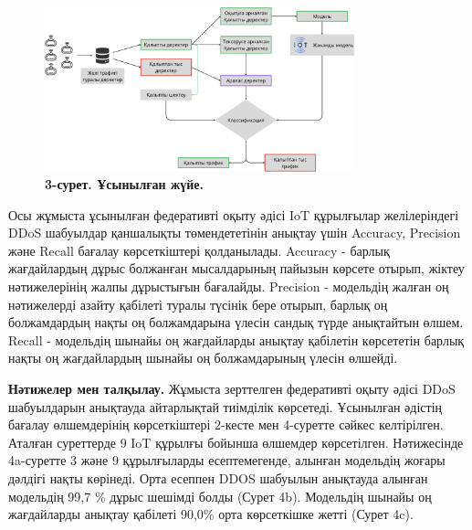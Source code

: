 \begin{figure}[H]
	\centering
	\includegraphics[width=0.8\textwidth]{assets/201}
	\caption*{\bfseries 3-сурет. Ұсынылған жүйе.}
\end{figure}



Осы жұмыста ұсынылған федеративті оқыту әдісі IoT құрылғылар
желілеріндегі DDoS шабуылдар қаншалықты төмендететінін анықтау үшін
Accuracy, Precision және Recall бағалау көрсеткіштері қолданылады.
Accuracy - барлық жағдайлардың дұрыс болжанған мысалдарының пайызын
көрсете отырып, жіктеу нәтижелерінің жалпы дұрыстығын бағалайды.
Precision - модельдің жалған оң нәтижелерді азайту қабілеті туралы
түсінік бере отырып, барлық оң болжамдардың нақты оң болжамдарына үлесін
сандық түрде анықтайтын өлшем. Recall - модельдің шынайы оң жағдайларды
анықтау қабілетін көрсететін барлық нақты оң жағдайлардың шынайы оң
болжамдарының үлесін өлшейді.

{\bfseries Нәтижелер мен талқылау.} Жұмыста зерттелген федеративті оқыту
әдісі DDoS шабуылдарын анықтауда айтарлықтай тиімділік көрсетеді.
Ұсынылған әдістің бағалау өлшемдерінің көрсеткіштері 2-кесте мен
4-суретте сәйкес келтірілген. Аталған суреттерде 9 IoT құрылғы бойынша
өлшемдер көрсетілген. Нәтижесінде 4a-суретте 3 және 9 құрылғыларды
есептемегенде, алынған модельдің жоғары дәлдігі нақты көрінеді. Орта
есеппен DDOS шабуылын анықтауда алынған модельдің 99,7 \% дұрыс шешімді
болды (Сурет 4b). Модельдің шынайы оң жағдайларды анықтау қабілеті
90,0\% орта көрсеткішке жетті (Сурет 4c).

